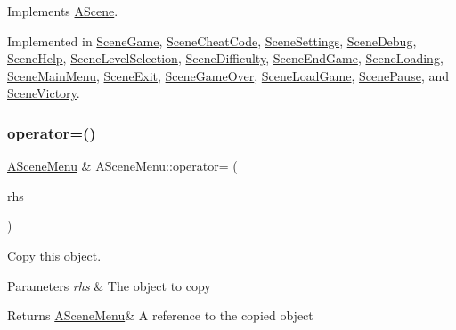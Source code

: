 Implements \hyperlink{class_a_scene_ad431efa9c183182e8b5abb1bb8437a74}{A\+Scene}.



Implemented in \hyperlink{class_scene_game_a841268ba3ea129f7c02cfafcafd32a4f}{Scene\+Game}, \hyperlink{class_scene_cheat_code_aa952941065350cdde0390695b32ac31d}{Scene\+Cheat\+Code}, \hyperlink{class_scene_settings_a19323950409add2d1b0df92799acf4d2}{Scene\+Settings}, \hyperlink{class_scene_debug_a4e413808e3d50dd29f9e1d07df4e6c4c}{Scene\+Debug}, \hyperlink{class_scene_help_adabf402b245092d311b08ec1139aa3c5}{Scene\+Help}, \hyperlink{class_scene_level_selection_ab6374f18220f26c22e062bfacc2ff962}{Scene\+Level\+Selection}, \hyperlink{class_scene_difficulty_a7fb9dd5ee9d623e346d917cd7a5db956}{Scene\+Difficulty}, \hyperlink{class_scene_end_game_a9503a63d52d2a11dbc56c97f35ff6eae}{Scene\+End\+Game}, \hyperlink{class_scene_loading_aa0463a9826f1b50e5980e41d57c80778}{Scene\+Loading}, \hyperlink{class_scene_main_menu_a11f68db49f9bf996efb0ce14913e5580}{Scene\+Main\+Menu}, \hyperlink{class_scene_exit_ad9168291bb031fee797a7964590e1b73}{Scene\+Exit}, \hyperlink{class_scene_game_over_a7ddd370503e10ff64e3d023f0a0acdb8}{Scene\+Game\+Over}, \hyperlink{class_scene_load_game_a4ef89351e679b7f681fa55e5f723dd16}{Scene\+Load\+Game}, \hyperlink{class_scene_pause_ae5e00c5fcd82e97985d93f918b9e4b35}{Scene\+Pause}, and \hyperlink{class_scene_victory_ab7dc4308732478fa13c8a3209f63e6b7}{Scene\+Victory}.

\mbox{\label{class_a_scene_menu_a3e4fc24a1fb0bcd6296f4856a2e3c611}} 
\subsubsection{\texorpdfstring{operator=()}{operator=()}}
{\footnotesize\ttfamily \hyperlink{class_a_scene_menu}{A\+Scene\+Menu} \& A\+Scene\+Menu\+::operator= (\begin{DoxyParamCaption}\item[{\hyperlink{class_a_scene_menu}{A\+Scene\+Menu} const \&}]{rhs }\end{DoxyParamCaption})}



Copy this object. 


\begin{DoxyParams}{Parameters}
{\em rhs} & The object to copy \\
\hline
\end{DoxyParams}
\begin{DoxyReturn}{Returns}
\hyperlink{class_a_scene_menu}{A\+Scene\+Menu}\& A reference to the copied object 
\end{DoxyReturn}
\mbox{\label{class_a_scene_menu_a1deeb5fd9be97376998cd2af36f29744}} 
